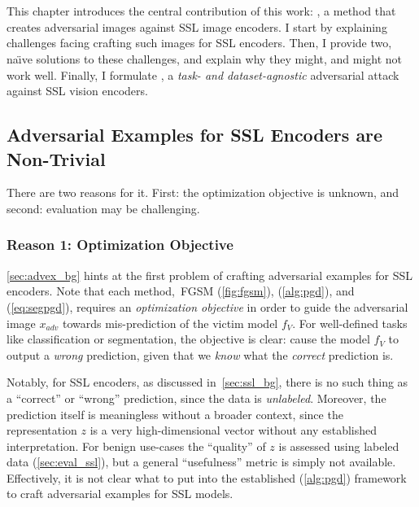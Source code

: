 \chapter{\EmbedAttack}\label{chap:method}

This chapter introduces the central contribution of this work: \EmbedAttack, a method that creates adversarial images against SSL image encoders. I start by explaining challenges facing crafting such images for SSL encoders. Then, I provide two, na\"{\i}ve solutions to these challenges, and explain why they might, and might not work well. Finally, I formulate \EmbedAttack, a \textit{task- and dataset-agnostic} adversarial attack against SSL vision encoders.

\section{Adversarial Examples for SSL Encoders are Non-Trivial}\label{sec:advex_ssl_problems}

There are two reasons for it. First: the optimization objective is unknown, and second: evaluation may be challenging.

\subsection{Reason 1: Optimization Objective}

\cref{sec:advex_bg} hints at the first problem of crafting adversarial examples for SSL encoders. Note that each method,~\ie FGSM (\cref{fig:fgsm}), \PGD (\cref{alg:pgd}), and \SegPGD (\cref{eq:segpgd}), requires an \textit{optimization objective} in order to guide the adversarial image $x_{adv}$ towards mis-prediction of the victim model $f_V$. For well-defined tasks like classification or segmentation, the objective is clear: cause the model $f_V$ to output a \textit{wrong} prediction, given that we \textit{know} what the \textit{correct} prediction is.

Notably, for SSL encoders, as discussed in~\cref{sec:ssl_bg}, there is no such thing as a ``correct'' or ``wrong'' prediction, since the data is \textit{unlabeled}. Moreover, the prediction itself is meaningless without a broader context, since the representation $z$ is a very high-dimensional vector without any established interpretation. For benign use-cases the ``quality'' of $z$ is assessed using labeled data (\cref{sec:eval_ssl}), but a general ``usefulness'' metric is simply not available. Effectively, it is not clear what to put into the established \PGD (\cref{alg:pgd}) framework to craft adversarial examples for SSL models.


